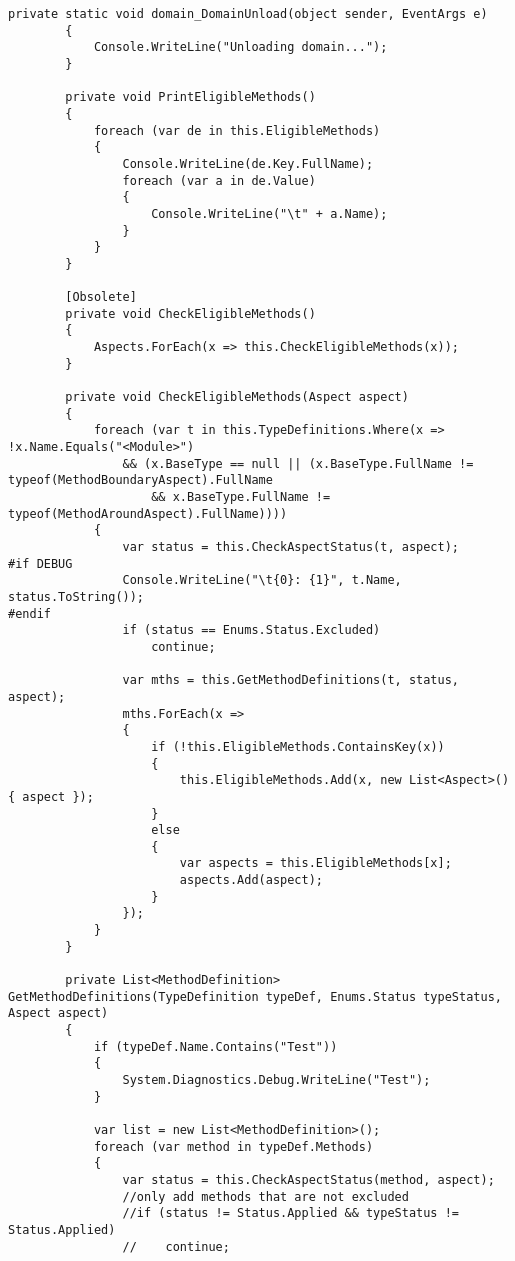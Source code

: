 \begin{lstlisting}[caption={../buffalo/Weaver.cs}, label=../buffalo/Weaver.cs, frame=tb, basicstyle=\scriptsize]
        private static void domain_DomainUnload(object sender, EventArgs e)
        {
            Console.WriteLine("Unloading domain...");
        }

        private void PrintEligibleMethods()
        {
            foreach (var de in this.EligibleMethods)
            {
                Console.WriteLine(de.Key.FullName);
                foreach (var a in de.Value)
                {
                    Console.WriteLine("\t" + a.Name);
                }
            }
        }

        [Obsolete]
        private void CheckEligibleMethods()
        {
            Aspects.ForEach(x => this.CheckEligibleMethods(x));
        }

        private void CheckEligibleMethods(Aspect aspect)
        {
            foreach (var t in this.TypeDefinitions.Where(x => !x.Name.Equals("<Module>")
                && (x.BaseType == null || (x.BaseType.FullName != typeof(MethodBoundaryAspect).FullName
                    && x.BaseType.FullName != typeof(MethodAroundAspect).FullName))))
            {
                var status = this.CheckAspectStatus(t, aspect);
#if DEBUG
                Console.WriteLine("\t{0}: {1}", t.Name, status.ToString());
#endif
                if (status == Enums.Status.Excluded)
                    continue;

                var mths = this.GetMethodDefinitions(t, status, aspect);
                mths.ForEach(x =>
                {
                    if (!this.EligibleMethods.ContainsKey(x))
                    {
                        this.EligibleMethods.Add(x, new List<Aspect>() { aspect });
                    }
                    else
                    {
                        var aspects = this.EligibleMethods[x];
                        aspects.Add(aspect);
                    }
                });
            }
        }

        private List<MethodDefinition> GetMethodDefinitions(TypeDefinition typeDef, Enums.Status typeStatus, Aspect aspect)
        {
            if (typeDef.Name.Contains("Test"))
            {
                System.Diagnostics.Debug.WriteLine("Test");
            }

            var list = new List<MethodDefinition>();
            foreach (var method in typeDef.Methods)
            {
                var status = this.CheckAspectStatus(method, aspect);
                //only add methods that are not excluded
                //if (status != Status.Applied && typeStatus != Status.Applied)
                //    continue;


\end{lstlisting}
